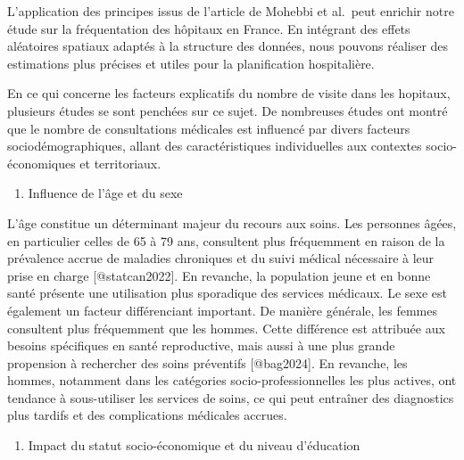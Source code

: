 \documentclass[
]{article}
\providecommand{\tightlist}{%
  \setlength{\itemsep}{0pt}\setlength{\parskip}{0pt}}
\begin{document}
L'application des principes issus de l'article de Mohebbi et al.~peut
enrichir notre étude sur la fréquentation des hôpitaux en France. En
intégrant des effets aléatoires spatiaux adaptés à la structure des
données, nous pouvons réaliser des estimations plus précises et utiles
pour la planification hospitalière.

En ce qui concerne les facteurs explicatifs du nombre de visite dans les
hopitaux, plusieurs études se sont penchées sur ce sujet. De nombreuses
études ont montré que le nombre de consultations médicales est influencé
par divers facteurs sociodémographiques, allant des caractéristiques
individuelles aux contextes socio-économiques et territoriaux.

\begin{enumerate}
\def\labelenumi{\arabic{enumi}.}
\tightlist
\item
  Influence de l'âge et du sexe
\end{enumerate}

L'âge constitue un déterminant majeur du recours aux soins. Les
personnes âgées, en particulier celles de 65 à 79 ans, consultent plus
fréquemment en raison de la prévalence accrue de maladies chroniques et
du suivi médical nécessaire à leur prise en charge {[}@statcan2022{]}.
En revanche, la population jeune et en bonne santé présente une
utilisation plus sporadique des services médicaux. Le sexe est également
un facteur différenciant important. De manière générale, les femmes
consultent plus fréquemment que les hommes. Cette différence est
attribuée aux besoins spécifiques en santé reproductive, mais aussi à
une plus grande propension à rechercher des soins préventifs
{[}@bag2024{]}. En revanche, les hommes, notamment dans les catégories
socio-professionnelles les plus actives, ont tendance à sous-utiliser
les services de soins, ce qui peut entraîner des diagnostics plus
tardifs et des complications médicales accrues.

\begin{enumerate}
\def\labelenumi{\arabic{enumi}.}
\setcounter{enumi}{1}
\tightlist
\item
  Impact du statut socio-économique et du niveau d'éducation
\end{enumerate}
\end{document}
